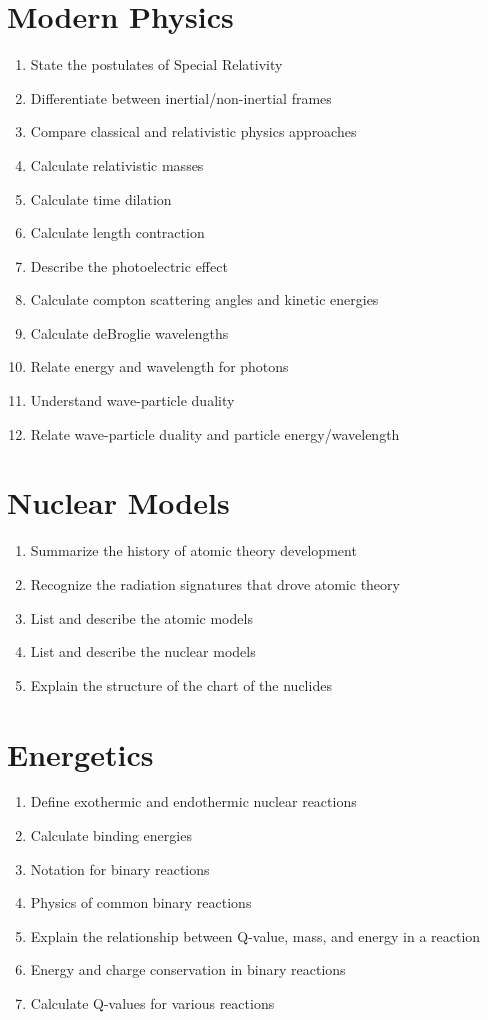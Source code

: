 \documentclass{article}
\begin{document}
\section{Modern Physics}
\begin{enumerate}	
	\item{State the postulates of Special Relativity}
	\item{Differentiate between inertial/non-inertial frames}
	\item{Compare classical and relativistic physics approaches}
	\item{Calculate relativistic masses}
	\item{Calculate time dilation}
	\item{Calculate length contraction}
	\item{Describe the photoelectric effect}
	\item{Calculate compton scattering angles and kinetic energies}
	\item{Calculate deBroglie wavelengths}
	\item{Relate energy and wavelength for photons}
	\item{Understand wave-particle duality}
	\item{Relate wave-particle duality and particle energy/wavelength}
\end{enumerate}

\section{Nuclear Models}

\begin{enumerate}
	\item{Summarize the history of atomic theory development}
	\item{Recognize the radiation signatures that drove atomic theory}
	\item{List and describe the atomic models}
	\item{List and describe the nuclear models}
	\item{Explain the structure of the chart of the nuclides}
\end{enumerate}

\section{Energetics}

\begin{enumerate}		
	\item{Define exothermic and endothermic nuclear reactions}
	\item{Calculate binding energies}
	\item{Notation for binary reactions}
	\item{Physics of common binary reactions}
	\item{Explain the relationship between Q-value, mass, and energy in a reaction}
	\item{Energy and charge conservation in binary reactions}
	\item{Calculate Q-values for various reactions} 
\end{enumerate}	
\end{document}
